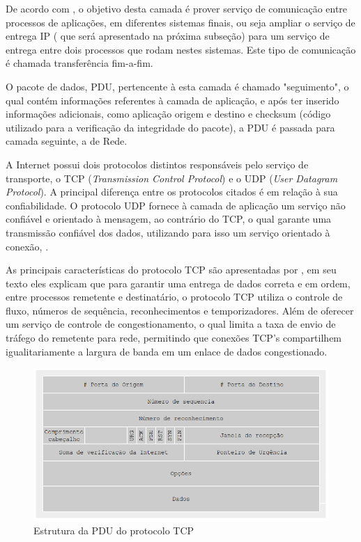 De acordo com , o objetivo desta camada é prover serviço de comunicação entre processos de aplicações, em diferentes sistemas finais, ou seja ampliar o serviço de entrega IP ( que será apresentado na próxima subseção) para um serviço de entrega entre dois processos que rodam nestes sistemas. Este tipo de comunicação é chamada transferência fim-a-fim.

O pacote de dados, PDU, pertencente à esta camada é chamado "seguimento", o qual contém informações referentes à camada de aplicação, e após ter inserido informaç\~oes adicionais, como aplicaç\~ao origem e destino e checksum (c\'odigo utilizado para a verificaç\~ao da integridade do pacote), a PDU é passada para camada seguinte, a de Rede.

A Internet possui dois protocolos distintos responsáveis pelo serviço de transporte, o TCP (\textit{Transmission Control Protocol}) e o UDP (\textit{User Datagram Protocol}). A principal diferença entre os protocolos citados é em relação à sua confiabilidade. O protocolo UDP fornece à camada de aplicação um serviço não confiável e orientado à mensagem, ao contrário do TCP, o qual garante uma transmissão confiável dos dados, utilizando para isso um serviço orientado à conexão, \cite{COMER}.

As principais características do protocolo TCP são apresentadas por , em seu texto eles explicam que para garantir uma entrega de dados correta e em ordem, entre processos remetente e destinatário, o protocolo TCP utiliza o controle de fluxo, números de sequência, reconhecimentos e temporizadores. Além de oferecer um serviço de controle de congestionamento, o qual limita a taxa de envio de tráfego do remetente para rede, permitindo que conexões TCP's compartilhem igualitariamente a largura de banda em um enlace de dados congestionado.

\begin{figure}[H]
	\centering
    \includegraphics[width=\textwidth]{04-figuras/TCP.png}
    \caption{Estrutura da PDU do protocolo TCP}
    \label{fig:TCP}
\end{figure}

